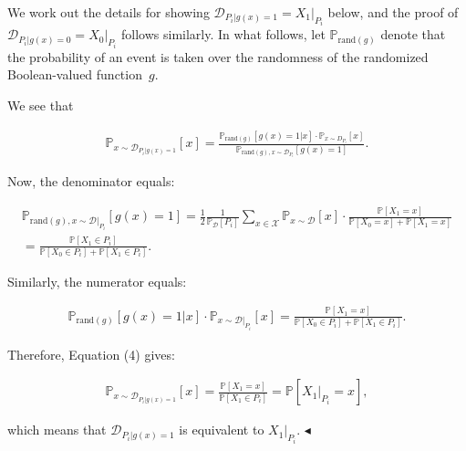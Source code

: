 \documentclass[10pt,a4paper]{article}
\begin{document}
We work out the details for showing $\mathcal{D}_{P_{i}|g(x)=1}=X_{1}|_{P_{i}}$ below, and the proof of $\mathcal{D}_{P_{i}|g(x)=0}=X_{0}|_{P_{i}}$ follows similarly. In what follows, let $\mathbb{P}_{\text{rand}(g)}$ denote that the probability of an event is taken over the randomness of the randomized Boolean-valued function $g$.\par




We see that\par


\[\begin{gathered}
\mathbb{P}_{x\sim\mathcal{D}_{P_{i}|g(x)=1}}\left[x\right]=\frac{\mathbb{P}_{\text{rand}(g)}[g(x)=1|x]\cdot\mathbb{P}_{x\sim D_{P_{i}}}[x]}{\mathbb{P}_{\text{rand}(g),x\sim\mathcal{D}_{P_{i}}}[g(x)=1]}.
\end{gathered}\]


Now, the denominator equals:\par


\[\begin{gathered}
\displaystyle\mathbb{P}_{\text{rand}(g),x\sim\mathcal{D}|_{P_{i}}}[g(x)=1] \displaystyle=\frac{1}{2}\frac{1}{\mathbb{P}_{\mathcal{D}}[P_{i}]}\sum_{x\in\mathcal{X}}\mathbb{P}_{x\sim\mathcal{D}}[x]\cdot\frac{\mathbb{P}[X_{1}=x]}{\mathbb{P}[X_{0}=x]+\mathbb{P}[X_{1}=x]} \\
\displaystyle=\frac{\mathbb{P}[X_{1}\in P_{i}]}{\mathbb{P}[X_{0}\in P_{i}]+\mathbb{P}[X_{1}\in P_{i}]}.
\end{gathered}\]


Similarly, the numerator equals:\par


\[\begin{gathered}
\mathbb{P}_{\text{rand}(g)}[g(x)=1|x]\cdot\mathbb{P}_{x\sim\mathcal{D}|_{P_{i}}}[x]=\frac{\mathbb{P}[X_{1}=x]}{\mathbb{P}[X_{0}\in P_{i}]+\mathbb{P}[X_{1}\in P_{i}]}.
\end{gathered}\]


Therefore, Equation (4) gives:\par


\[\begin{gathered}
\mathbb{P}_{x\sim\mathcal{D}_{P_{i}|g(x)=1}}\left[x\right]=\frac{\mathbb{P}[X_{1}=x]}{\mathbb{P}[X_{1}\in P_{i}]}=\mathbb{P}[X_{1}|_{P_{i}}=x],
\end{gathered}\]


which means that $\mathcal{D}_{P_{i}|g(x)=1}$ is equivalent to $X_{1}|_{P_{i}}$.
$\blacktriangleleft$\par
\end{document}
